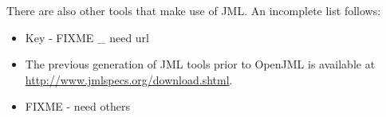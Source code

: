 There are also other tools that make use of JML. An incomplete list follows:
\begin{itemize}
\item Key - FIXME _ need url
\item The previous generation of JML tools prior to OpenJML is available at \url{http://www.jmlspecs.org/download.shtml}.
\item FIXME - need others
\end{itemize}